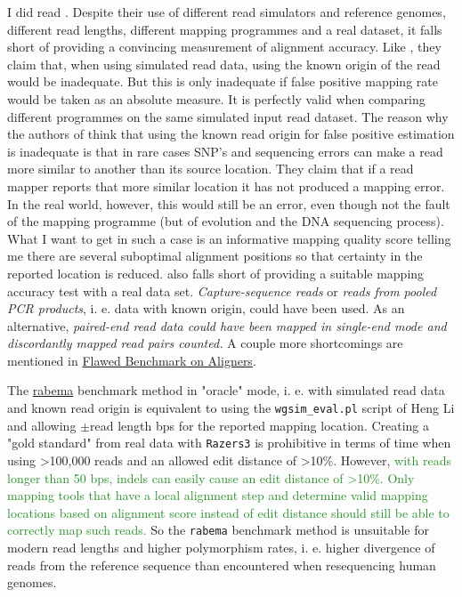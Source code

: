 \documentclass{article}\usepackage[]{graphicx}\usepackage[]{color}
\newcommand{\roger}[1]{ \textcolor[named]{ForestGreen}{#1} }
\begin{document}
I did read \cite{Hatem2013}. Despite their use of different read simulators and reference genomes, different read lengths, different mapping programmes and a real dataset, it falls short of providing a convincing measurement of alignment accuracy. Like \cite{Holtgrewe2011}, they claim that, when using simulated read data, using the known origin of the read would be inadequate. But this is only inadequate if false positive mapping rate would be taken as an absolute measure. It is perfectly valid when comparing different programmes on the same simulated input read dataset. The reason why the authors of \cite{Hatem2013} think that using the known read origin for false positive estimation is inadequate is that in rare cases SNP's and sequencing errors can make a read more similar to another than its source location. They claim that if a read mapper reports that more similar location it has not produced a mapping error. In the real world, however, this would still be an error, even though not the fault of the mapping programme (but of evolution and the DNA sequencing process). What I want to get in such a case is an informative mapping quality score telling me there are several suboptimal alignment positions so that certainty in the reported location is reduced. \cite{Hatem2013} also falls short of providing a suitable mapping accuracy test with a real data set. \emph{Capture-sequence reads} or \emph{reads from pooled PCR products}, i. e. data with known origin, could have been used. As an alternative, \emph{paired-end read data could have been mapped in single-end mode and discordantly mapped read pairs counted.} A couple more shortcomings are mentioned in \href{http://lh3lh3.users.sourceforge.net/false-bench.shtml}{Flawed Benchmark on Aligners}.

The \href{http://www.seqan.de/projects/rabema/manual/#toc-using-rabema-in-normal-mode}{rabema} benchmark method \citep{Holtgrewe2011} in "oracle" mode, i. e. with simulated read data and known read origin is equivalent to using the \texttt{wgsim\_eval.pl} script of Heng Li and allowing $\pm$\textsf{read length} bps for the reported mapping location. Creating a "gold standard" from real data with \texttt{Razers3} is prohibitive in terms of time when using >100,000 reads and an allowed edit distance of >10\%. However, \roger{with reads longer than 50 bps, indels can easily cause an edit distance of >10\%. Only mapping tools that have a local alignment step and determine valid mapping locations based on alignment score instead of edit distance should still be able to correctly map such reads.} So the \texttt{rabema} benchmark method is unsuitable for modern read lengths and higher polymorphism rates, i. e. higher divergence of reads from the reference sequence than encountered when resequencing human genomes.
\end{document}
